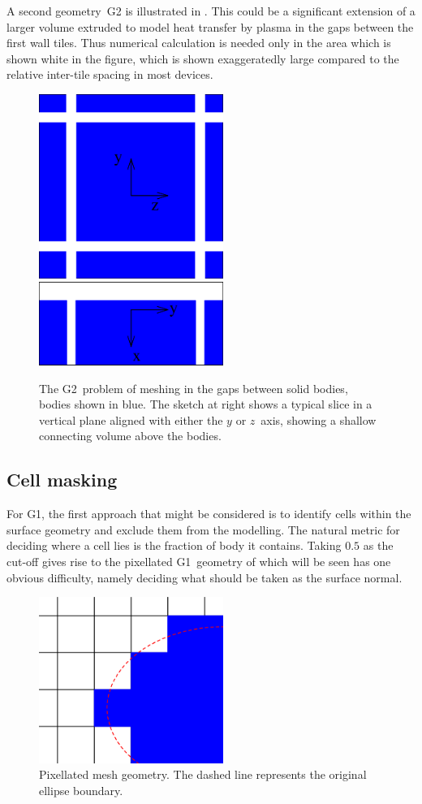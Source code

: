 A second geometry~G2 is illustrated in . This could be a significant extension of 
a larger volume extruded to model heat transfer by plasma in the gaps between the first wall
tiles. Thus numerical calculation is needed only in the area which is shown white in the figure,
which is shown exaggeratedly large compared to the relative inter-tile spacing in most devices.
\begin{figure}
\centerline{\includegraphics[width=6cm]{../pics/gaps}
\includegraphics[width=6cm]{../pics/vgaps}
}
\caption{The G2~problem of meshing in the gaps between solid bodies, bodies shown in blue.
The sketch at
right shows a typical slice in a vertical plane aligned with either the $y$ or $z$~axis,
showing a shallow connecting volume above the bodies.
\label{fig:gaps}}
\end{figure}

\clearpage
\subsection{Cell masking}\label{sec:mask}
For G1, the first approach that might be considered is to identify cells within the surface
geometry and exclude them from the modelling. The natural metric for deciding where
a cell lies is the fraction of body it contains. Taking $0.5$ as the cut-off
gives rise to the pixellated G1~geometry of  which will be seen
has one obvious difficulty, namely
deciding what should be taken as the surface normal.
\begin{figure}
\centerline{\includegraphics[width=6cm]{../pics/mellpix}}
\caption{Pixellated mesh geometry. The dashed line represents the original ellipse boundary.
\label{fig:mellpix}}
\end{figure}

